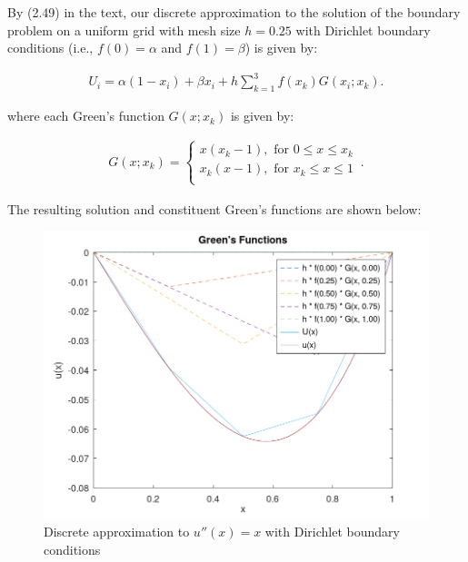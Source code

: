 \begin{solution}\ \\\\
    By (2.49) in the text, our discrete approximation to the solution of the boundary problem on a uniform grid with 
    mesh size $h=0.25$ with Dirichlet boundary conditions (i.e., $f(0) = \alpha$ and $f(1) = \beta$) is given by:

    \begin{align*}
        U_i = \alpha (1 - x_i)  + \beta x_i + h \sum\limits_{k=1}^{3}{f(x_k) G(x_i; x_k)}.
    \end{align*}

    where each Green's function $G(x; x_k)$ is given by:

    \begin{align*}
        G(x; x_k) = \begin{cases}
            x(x_k - 1), \text{ for } 0 \le x \le x_k \\
            x_k(x - 1), \text{ for } x_k \le x \le 1 \\
        \end{cases}\, .
    \end{align*}

    The resulting solution and constituent Green's functions are shown below:

    \begin{figure}[h]
        \includegraphics[width=13cm]{problem1c_discrete_approx.png}
        \centering
        \caption{Discrete approximation to $u''(x)=x$ with Dirichlet boundary conditions}
    \end{figure}


\end{solution}